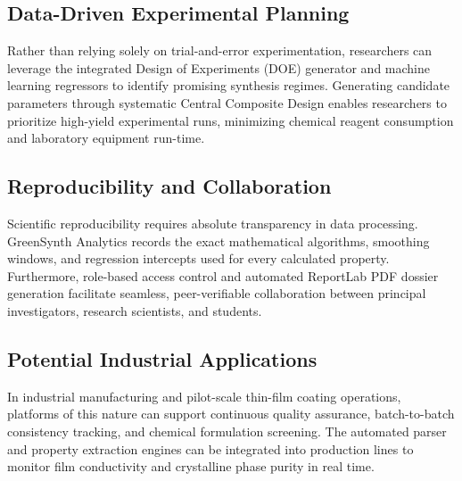 \documentclass[12pt,a4paper,oneside]{report}
\begin{document}
{{{\subsection{Data-Driven Experimental Planning}
Rather than relying solely on trial-and-error experimentation, researchers can leverage the integrated Design of Experiments (DOE) generator and machine learning regressors to identify promising synthesis regimes. Generating candidate parameters through systematic Central Composite Design enables researchers to prioritize high-yield experimental runs, minimizing chemical reagent consumption and laboratory equipment run-time.

\subsection{Reproducibility and Collaboration}
Scientific reproducibility requires absolute transparency in data processing. GreenSynth Analytics records the exact mathematical algorithms, smoothing windows, and regression intercepts used for every calculated property. Furthermore, role-based access control and automated ReportLab PDF dossier generation facilitate seamless, peer-verifiable collaboration between principal investigators, research scientists, and students.

\subsection{Potential Industrial Applications}
In industrial manufacturing and pilot-scale thin-film coating operations, platforms of this nature can support continuous quality assurance, batch-to-batch consistency tracking, and chemical formulation screening. The automated parser and property extraction engines can be integrated into production lines to monitor film conductivity and crystalline phase purity in real time.

}}}
\end{document}
